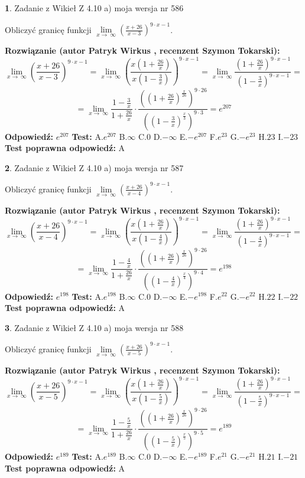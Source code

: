 \documentclass[12pt, a4paper]{article}
\theoremstyle{definition} %
\newtheorem{zad}{}
\newcommand{\zadStart}[1]{\begin{zad}#1\newline}
\newcommand{\zadStop}{\end{zad}}
\newcommand{\rozwStart}[2]{\noindent \textbf{Rozwiązanie (autor #1 , recenzent #2): }\newline}
\newcommand{\rozwStop}{\newline}
\newcommand{\odpStart}{\noindent \textbf{Odpowiedź:}\newline}
\newcommand{\odpStop}{\newline}
\newcommand{\testStart}{\noindent \textbf{Test:}\newline}
\newcommand{\testStop}{\newline}
\newcommand{\kluczStart}{\noindent \textbf{Test poprawna odpowiedź:}\newline}
\newcommand{\kluczStop}{\newline}
\begin{document}
\zadStart{Zadanie z Wikieł Z 4.10 a) moja wersja nr 586}

Obliczyć granicę funkcji  $\lim\limits_{x\to\ \infty}(\frac{x+26}{x-3})^{9\cdot x-1}$.
\zadStop
\rozwStart{Patryk Wirkus}{Szymon Tokarski}
$$\lim\limits_{x\to\ \infty}(\frac{x+26}{x-3})^{9\cdot x-1} = \lim\limits_{x\to\ \infty}(\frac{x(1+\frac{26}{x})}{x(1-\frac{3}{x})})^{9\cdot x-1}=\lim\limits_{x\to\ \infty}\frac{(1+\frac{26}{x})^{9\cdot x-1}}{(1-\frac{3}{x})^{9\cdot x-1}}=$$
$$=\lim\limits_{x\to\ \infty}\frac{1-\frac{3}{x}}{1+\frac{26}{x}}\cdot\frac{((1+\frac{26}{x})^{\frac{x}{26}})^{9\cdot26}}{((1-\frac{3}{x})^{\frac{x}{3}})^{9\cdot3}}=e^{207}$$
\rozwStop
\odpStart
$e^{207}$
\odpStop
\testStart
A.$e^{207}$ B.$\infty$ C.$0$ D.$-\infty$ E.$-e^{207}$
F.$e^{23}$ G.$-e^{23}$
H.$23$
I.$-23$
\testStop
\kluczStart
A
\kluczStop



\zadStart{Zadanie z Wikieł Z 4.10 a) moja wersja nr 587}

Obliczyć granicę funkcji  $\lim\limits_{x\to\ \infty}(\frac{x+26}{x-4})^{9\cdot x-1}$.
\zadStop
\rozwStart{Patryk Wirkus}{Szymon Tokarski}
$$\lim\limits_{x\to\ \infty}(\frac{x+26}{x-4})^{9\cdot x-1} = \lim\limits_{x\to\ \infty}(\frac{x(1+\frac{26}{x})}{x(1-\frac{4}{x})})^{9\cdot x-1}=\lim\limits_{x\to\ \infty}\frac{(1+\frac{26}{x})^{9\cdot x-1}}{(1-\frac{4}{x})^{9\cdot x-1}}=$$
$$=\lim\limits_{x\to\ \infty}\frac{1-\frac{4}{x}}{1+\frac{26}{x}}\cdot\frac{((1+\frac{26}{x})^{\frac{x}{26}})^{9\cdot26}}{((1-\frac{4}{x})^{\frac{x}{4}})^{9\cdot4}}=e^{198}$$
\rozwStop
\odpStart
$e^{198}$
\odpStop
\testStart
A.$e^{198}$ B.$\infty$ C.$0$ D.$-\infty$ E.$-e^{198}$
F.$e^{22}$ G.$-e^{22}$
H.$22$
I.$-22$
\testStop
\kluczStart
A
\kluczStop



\zadStart{Zadanie z Wikieł Z 4.10 a) moja wersja nr 588}

Obliczyć granicę funkcji  $\lim\limits_{x\to\ \infty}(\frac{x+26}{x-5})^{9\cdot x-1}$.
\zadStop
\rozwStart{Patryk Wirkus}{Szymon Tokarski}
$$\lim\limits_{x\to\ \infty}(\frac{x+26}{x-5})^{9\cdot x-1} = \lim\limits_{x\to\ \infty}(\frac{x(1+\frac{26}{x})}{x(1-\frac{5}{x})})^{9\cdot x-1}=\lim\limits_{x\to\ \infty}\frac{(1+\frac{26}{x})^{9\cdot x-1}}{(1-\frac{5}{x})^{9\cdot x-1}}=$$
$$=\lim\limits_{x\to\ \infty}\frac{1-\frac{5}{x}}{1+\frac{26}{x}}\cdot\frac{((1+\frac{26}{x})^{\frac{x}{26}})^{9\cdot26}}{((1-\frac{5}{x})^{\frac{x}{5}})^{9\cdot5}}=e^{189}$$
\rozwStop
\odpStart
$e^{189}$
\odpStop
\testStart
A.$e^{189}$ B.$\infty$ C.$0$ D.$-\infty$ E.$-e^{189}$
F.$e^{21}$ G.$-e^{21}$
H.$21$
I.$-21$
\testStop
\kluczStart
A
\kluczStop
\end{document}
